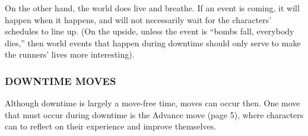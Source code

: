 \documentclass[oneside,10pt]{article}
\begin{document}
\begin{multicols}{2}
On the other hand, the world does live and breathe. If an
event is coming, it will happen when it happens, and will not
necessarily wait for the characters’ schedules to line up. (On
 the upside, unless the event is “bombs fall, everybody dies,”
    then world events that happen during downtime should only
   serve to make the runners’ lives more interesting).

\subsubsection{DOWNTIME MOVES}
Although downtime is largely a move-free time, moves can
occur then. One move that must occur during downtime is
the Advance move (page 5), where characters can to reflect on their experience and improve themselves.

\end{multicols}

\newpage


\end{document}

